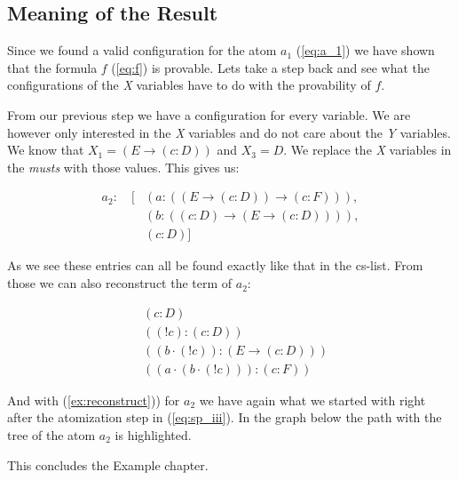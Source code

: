 \subsection{Meaning of the Result}
Since we found a valid configuration for the atom $a_1$ (\ref{eq:a_1}) we have shown that the formula $f$ (\ref{eq:f}) is provable. Lets take a step back and see what the configurations of the \emph{X} variables have to do with the provability of $f$.

From our previous step we have a configuration for every variable. We are however only interested in the \emph{X} variables and do not care about the \emph{Y} variables. We know that $X_1 = (E \rightarrow (c:D))$ and $X_3 = D$. We replace the \emph{X} variables in the \emph{musts} with those values. This gives us:

\begin{equation}
\begin{split}
	a_2: \quad [&(a: ((E \rightarrow (c:D)) \rightarrow (c:F))), \\
	&(b: ((c:D) \rightarrow (E \rightarrow (c:D)))), \\
	&(c: D)]
\end{split}
\end{equation}

As we see these entries can all be found exactly like that in the cs-list. From those we can also reconstruct the term of $a_2$: 

\begin{align}
	& (c:D) \\
	& ((!c):(c:D)) \\
	& ((b\cdot(!c)):(E \rightarrow (c:D)))\\
	& ((a\cdot(b\cdot(!c))):(c:F)) \label{ex:reconstruct}
\end{align}

And with (\ref{ex:reconstruct})) for $a_2$ we have again what we started with right after the atomization step in (\ref{eq:sp_iii}). In the graph below the path with the tree of the atom $a_2$ is highlighted.



\bigskip
This concludes the Example chapter. 